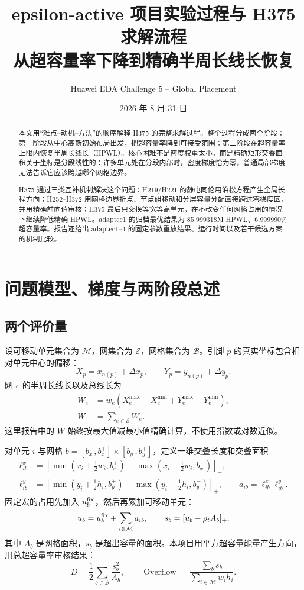 \documentclass[UTF8,a4paper,11pt]{ctexrep}
\title{epsilon-active 项目实验过程与 H375 求解流程\\
\large 从超容量率下降到精确半周长线长恢复}
\author{Huawei EDA Challenge 5 -- Global Placement}
\date{2026 年 8 月 31 日}
\newcommand{\Overflow}{\operatorname{Overflow}}
\newcommand{\Mcal}{\mathcal{M}}
\newcommand{\Bcal}{\mathcal{B}}
\newcommand{\Ecal}{\mathcal{E}}
\begin{document}
\maketitle
\begin{abstract}
本文用“难点--动机--方法”的顺序解释 H375 的完整求解过程。整个过程分成两个阶段：第一阶段从中心高斯初始布局出发，把超容量率降到可接受范围；第二阶段在超容量率上限内恢复半周长线长（HPWL）。核心困难不是密度权重太小，而是精确矩形交叠面积关于坐标是分段线性的：许多单元处在分段内部时，密度梯度恰为零，普通局部梯度无法告诉它应该跨越哪个网格边界。

H375 通过三类互补机制解决这个问题：H219/H221 的静电同伦用泊松方程产生全局长程方向；H252--H372 用网格边界折点、节点组移动和分层容量分配直接跨过零梯度区，并用精确前向值审核；H375 最后只交换等宽等高单元，在不改变任何网格占用的情况下继续降低精确 HPWL。adaptec1 的归档最优结果为 85.999318M HPWL、6.999990\% 超容量率。报告还给出 adaptec1--4 的固定参数重放结果、运行时间以及若干候选方案的机制比较。
\end{abstract}
\tableofcontents

\chapter{问题模型、梯度与两阶段总述}
\section{两个评价量}
设可移动单元集合为 $\Mcal$，网集合为 $\Ecal$，网格集合为 $\Bcal$。引脚 $p$ 的真实坐标包含相对单元中心的偏移：
\begin{equation}
 X_p=x_{n(p)}+\Delta x_p,\qquad Y_p=y_{n(p)}+\Delta y_p.
 \label{eq:pin}
\end{equation}
网 $e$ 的半周长线长以及总线长为
\begin{align}
 W_e&=w_e\left(X_e^{\max}-X_e^{\min}+Y_e^{\max}-Y_e^{\min}\right),\\
 W&=\sum_{e\in\Ecal}W_e. \label{eq:hpwl}
\end{align}
这里报告中的 $W$ 始终按最大值减最小值精确计算，不使用指数或对数近似。

对单元 $i$ 与网格 $b=[b_x^-,b_x^+]\times[b_y^-,b_y^+]$，定义一维交叠长度和交叠面积
\begin{align}
 \ell^x_{ib}&=\left[\min(x_i+\tfrac12w_i,b_x^+)
 -\max(x_i-\tfrac12w_i,b_x^-)\right]_+,\\
 \ell^y_{ib}&=\left[\min(y_i+\tfrac12h_i,b_y^+)
 -\max(y_i-\tfrac12h_i,b_y^-)\right]_+,\qquad
 a_{ib}=\ell^x_{ib}\ell^y_{ib}. \label{eq:overlaparea}
\end{align}
固定宏的占用先加入 $u_b^{\rm fix}$，然后再累加可移动单元：
\begin{equation}
 u_b=u_b^{\rm fix}+\sum_{i\in\Mcal}a_{ib},\qquad
 s_b=[u_b-\rho_tA_b]_+. \label{eq:occupancy}
\end{equation}
其中 $A_b$ 是网格面积，$s_b$ 是超出容量的面积。本项目用平方超容量能量产生方向，用总超容量率审核结果：
\begin{equation}
 D=\frac12\sum_{b\in\Bcal}\frac{s_b^2}{A_b},\qquad
 \Overflow=\frac{\sum_bs_b}{\sum_{i\in\Mcal}w_ih_i}. \label{eq:density}
\end{equation}
\end{document}
